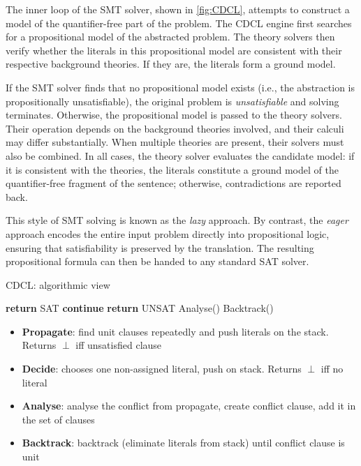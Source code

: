 The inner loop of the SMT solver, shown in \cref{fig:CDCL}, attempts to construct a model of the quantifier-free part of the problem.
The CDCL engine first searches for a propositional model of the abstracted problem.
The theory solvers then verify whether the literals in this propositional model are consistent with their respective background theories.
If they are, the literals form a ground model.


If the SMT solver finds that no propositional model exists (i.e., the abstraction is propositionally unsatisfiable), the original problem is \emph{unsatisfiable} and solving terminates.
Otherwise, the propositional model is passed to the theory solvers.
Their operation depends on the background theories involved, and their calculi may differ substantially.
When multiple theories are present, their solvers must also be combined.
In all cases, the theory solver evaluates the candidate model: if it is consistent with the theories, the literals constitute a ground model of the quantifier-free fragment of the sentence; otherwise, contradictions are reported back.

\begin{remark}
This style of SMT solving is known as the \emph{lazy} approach.
By contrast, the \emph{eager} approach encodes the entire input problem directly into propositional logic, ensuring that satisfiability is preserved by the translation.
The resulting propositional formula can then be handed to any standard SAT solver.
\end{remark}


\begin{algorithm}
\caption{CDCL: algorithmic view}
\label{alg:cdcl}
\begin{algorithmic}[1]
  \While{$\top$}
        \State \textbf{return} SAT
      \EndIf
      \State \textbf{continue}
    \EndIf
      \State \textbf{return} UNSAT
    \EndIf
    \State Analyse()
    \State Backtrack()
  \EndWhile
\EndProcedure
\end{algorithmic}
\begin{itemize}
  \item[] \textbf{Propagate}: find unit clauses repeatedly and push literals on the stack. Returns $\perp$ iff unsatisfied clause
  \item[] \textbf{Decide}: chooses one non-assigned literal, push on stack. Returns $\perp$ iff no literal
  \item[] \textbf{Analyse}: analyse the conflict from propagate, create conflict clause, add it in the set of clauses
  \item[] \textbf{Backtrack}: backtrack (eliminate literals from stack) until conflict clause is unit
\end{itemize}
\end{algorithm}


